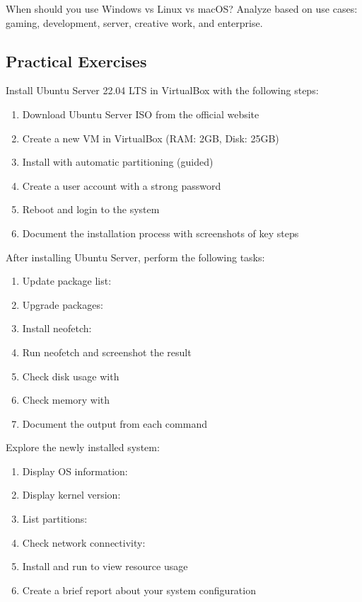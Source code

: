 \begin{exercisebox}[1.2]
When should you use Windows vs Linux vs macOS? Analyze based on use cases: gaming, development, server, creative work, and enterprise.
\end{exercisebox}

\subsection{Practical Exercises}

\begin{exercisebox}[1.3]
Install Ubuntu Server 22.04 LTS in VirtualBox with the following steps:
\begin{enumerate}
    \item Download Ubuntu Server ISO from the official website
    \item Create a new VM in VirtualBox (RAM: 2GB, Disk: 25GB)
    \item Install with automatic partitioning (guided)
    \item Create a user account with a strong password
    \item Reboot and login to the system
    \item Document the installation process with screenshots of key steps
\end{enumerate}
\end{exercisebox}

\begin{exercisebox}[1.4]
After installing Ubuntu Server, perform the following tasks:
\begin{enumerate}
    \item Update package list: 
    \item Upgrade packages: 
    \item Install neofetch: 
    \item Run neofetch and screenshot the result
    \item Check disk usage with 
    \item Check memory with 
    \item Document the output from each command
\end{enumerate}
\end{exercisebox}

\begin{exercisebox}[1.5]
Explore the newly installed system:
\begin{enumerate}
    \item Display OS information: 
    \item Display kernel version: 
    \item List partitions: 
    \item Check network connectivity: 
    \item Install and run  to view resource usage
    \item Create a brief report about your system configuration
\end{enumerate}
\end{exercisebox}

